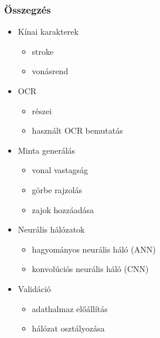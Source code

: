 \documentclass{beamer}
\begin{document}
\begin{frame}[fragile]
\frametitle{Összegzés}
\begin{itemize}
\item Kínai karakterek
	\begin{itemize}
	\item stroke
	\item vonásrend
	\end{itemize}
\item OCR
	\begin{itemize}
	\item részei
	\item használt OCR bemutatás
	\end{itemize}
\item Minta generálás
	\begin{itemize}
	\item vonal vastagság
	\item görbe rajzolás
	\item zajok hozzáadása
	\end{itemize}
\item Neurális hálózatok
	\begin{itemize}
	\item hagyományos neurális háló (ANN)
	\item konvolúciós neurális háló (CNN)
	\end{itemize}
\item Validáció
	\begin{itemize}
	\item adathalmaz előállítás
	\item hálózat osztályozása
	\end{itemize}
\end{itemize}

\end{frame}
\end{document}
